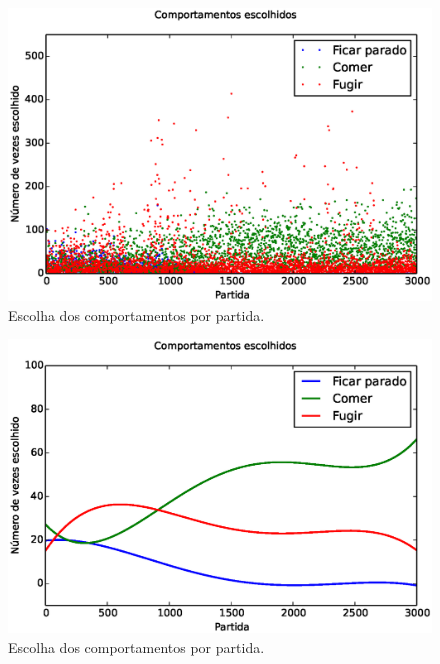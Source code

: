 \documentclass{beamer}
\begin{document}

\begin{frame}
\begin{figure}[h]
    \centering
    \includegraphics[width=\linewidth]{images/3_behaviors_small_map/chosen_behaviors}
    \caption{Escolha dos comportamentos por partida.}
    \label{img:3ComportamentosMapaPequeno:ComportamentosEscolhidos}
\end{figure}
\end{frame}


\begin{frame}
\begin{figure}[h]
    \centering
    \includegraphics[width=\linewidth]{images/3_behaviors_small_map/chosen_behaviors_pol}
    \caption{Escolha dos comportamentos por partida.}
    \label{img:3ComportamentosMapaPequeno:ComportamentosEscolhidosPolinomio}
\end{figure}
\end{frame}
\end{document}
